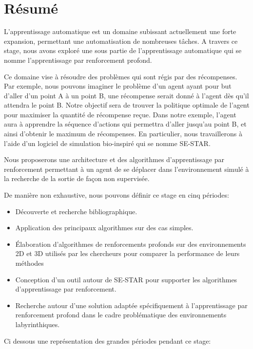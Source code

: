 \newpage


\section*{Résumé}
\bigskip

L'apprentissage automatique est un domaine subissant actuellement une forte expansion, permettant une automatisation de nombreuses tâches. A travers ce stage, nous avons exploré une sous partie de l'apprentissage automatique qui se nomme l'apprentissage par renforcement profond. 

Ce domaine vise à résoudre des problèmes qui sont régis par des récompenses. Par exemple, nous pouvons imaginer le problème d'un agent ayant pour but d'aller d'un point A à un point B, une récompense serait donné à l'agent dès qu'il attendra le point B. Notre objectif sera de trouver la politique optimale de l'agent pour maximiser la quantité de récompense reçue. Dans notre exemple, l'agent aura à apprendre la séquence d'actions qui permettra d'aller jusqu'au point B, et ainsi d'obtenir le maximum de récompenses. En particulier, nous travaillerons à l'aide d'un logiciel de simulation bio-inspiré qui se nomme SE-STAR. 

Nous proposerons une architecture et des algorithmes d'apprentissage par renforcement permettant à un agent de se déplacer dans l'environnement simulé à la recherche de la sortie de façon non supervisée. 

De manière non exhaustive, nous pouvons définir ce stage en cinq périodes: 
\begin{itemize}
    \item Découverte et recherche bibliographique.
    \item Application des principaux algorithmes sur des cas simples.
    \item Élaboration d'algorithmes de renforcements profonds sur des environnements 2D et 3D utilisés par les chercheurs pour comparer la performance de leurs méthodes
    \item Conception d'un outil autour de SE-STAR pour supporter les algorithmes d'apprentissage par renforcement.
    \item Recherche autour d'une solution adaptée spécifiquement à l'apprentissage par renforcement profond dans le cadre problématique des environnements labyrinthiques.
\end{itemize}

Ci dessous une représentation des grandes périodes pendant ce stage:

